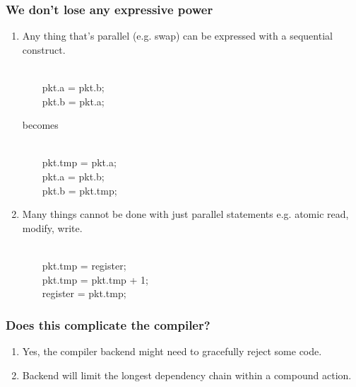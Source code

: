 \documentclass[aspectratio=169]{beamer}
\begin{document}
\begin{frame}[fragile]
  \frametitle{We don't lose any expressive power}
  \begin{enumerate}
  \item<1-> Any thing that's parallel (e.g. swap) can be expressed with a sequential construct.
    \begin{texttt} \\
    \ \ \ \   pkt.a = pkt.b; \\
    \ \ \ \   pkt.b = pkt.a; \\
    \end{texttt}
    becomes
    \begin{texttt} \\
    \ \ \ \   pkt.tmp = pkt.a; \\
    \ \ \ \   pkt.a = pkt.b; \\
    \ \ \ \   pkt.b = pkt.tmp; \\
    \end{texttt}
  \item<2-> Many things cannot be done with just parallel statements e.g. atomic read, modify, write.
    \begin{texttt} \\
    \ \ \ \   pkt.tmp = register; \\
    \ \ \ \   pkt.tmp = pkt.tmp  + 1; \\
    \ \ \ \   register = pkt.tmp; \\
    \end{texttt}
  \end{enumerate}
\end{frame}

\begin{frame}[fragile]
  \frametitle{Does this complicate the compiler?}
  \begin{enumerate}
    \item<1-> Yes, the compiler backend might need to gracefully reject some code.
    \item<2-> Backend will limit the longest dependency chain within a compound action.
  \end{enumerate}
\end{frame}
\end{document}
